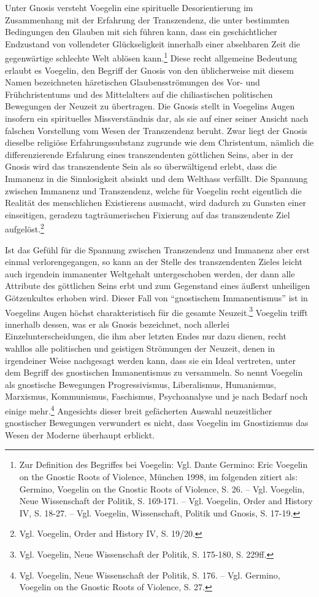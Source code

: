 Unter Gnosis versteht Voegelin eine spirituelle Desorientierung im
Zusammenhang mit der Erfahrung der Transzendenz, die unter bestimmten
Bedingungen den Glauben mit sich führen kann, dass ein geschichtlicher
Endzustand von vollendeter Glückseligkeit innerhalb einer absehbaren Zeit die
gegenwärtige schlechte Welt ablösen kann.\footnote{Zur Definition des
  Begriffes bei Voegelin: Vgl. Dante Germino: Eric Voegelin on the Gnostic
  Roots of Violence, München 1998, im folgenden zitiert als: Germino, Voegelin
  on the Gnostic Roots of Violence, S. 26. -- Vgl. Voegelin, Neue Wissenschaft
  der Politik, S. 169-171. -- Vgl. Voegelin, Order and History IV, S. 18-27. --
  Vgl. Voegelin, Wissenschaft, Politik und Gnosis, S. 17-19.} Diese recht
allgemeine Bedeutung erlaubt es Voegelin, den Begriff der Gnosis von den
üblicherweise mit diesem Namen bezeichneten häretischen Glaubensströmungen des
Vor- und Frühchristentums und des Mittelalters auf die chiliastischen
politischen Bewegungen der Neuzeit zu übertragen. Die Gnosis stellt in
Voegelins Augen insofern ein spirituelles Missverständnis dar, als sie auf
einer seiner Ansicht nach falschen Vorstellung vom Wesen der Transzendenz
beruht. Zwar liegt der Gnosis dieselbe religiöse Erfahrungssubstanz zugrunde
wie dem Christentum, nämlich die differenzierende Erfahrung eines
transzendenten göttlichen Seins, aber in der Gnosis wird das transzendente
Sein als so überwältigend erlebt, dass die Immanenz in die Sinnlosigkeit
absinkt und dem Welthass verfällt. Die Spannung zwischen Immanenz und
Transzendenz, welche für Voegelin recht eigentlich die Realität des
menschlichen Existierens ausmacht, wird dadurch zu Gunsten einer
einseitigen, geradezu tagträumerischen Fixierung auf das transzendente
Ziel aufgelöst.\footnote{Vgl. Voegelin, Order and History IV, S. 19/20.}

Ist das Gefühl für die Spannung zwischen Transzendenz und Immanenz aber erst
einmal verlorengegangen, so kann an der Stelle des transzendenten Zieles
leicht auch irgendein immanenter Weltgehalt untergeschoben werden, der dann
alle Attribute des göttlichen Seins erbt und zum Gegenstand eines äußerst
unheiligen Götzenkultes erhoben wird. Dieser Fall von "`gnostischem
Immanentismus"' ist in Voegelins Augen höchst charakteristisch für die gesamte
Neuzeit.\footnote{Vgl. Voegelin, Neue Wissenschaft der Politik, S. 175-180,
  S. 229ff.} Voegelin trifft innerhalb dessen, was er als Gnosis bezeichnet,
noch allerlei Einzelunterscheidungen, die ihm aber letzten Endes nur dazu
dienen, recht wahllos alle politischen und geistigen Strömungen der Neuzeit,
denen in irgendeiner Weise nachgesagt werden kann, dass sie ein Ideal
vertreten, unter dem Begriff des gnostischen Immanentismus zu versammeln. So
nennt Voegelin als gnostische Bewegungen Progressivismus, Liberalismus,
Humanismus, Marxismus, Kommunismus, Faschismus, Psychoanalyse und je nach
Bedarf noch einige mehr.\footnote{Vgl. Voegelin, Neue Wissenschaft der
  Politik, S. 176. -- Vgl. Germino, Voegelin on the Gnostic Roots of Violence,
  S. 27.} Angesichts dieser breit gefächerten Auswahl neuzeitlicher gnostischer
Bewegungen verwundert es nicht, dass Voegelin im Gnostizismus das Wesen der
Moderne überhaupt erblickt.

